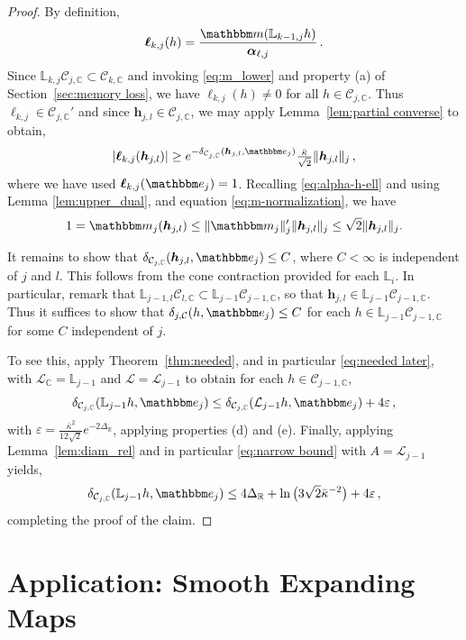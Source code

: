 \documentclass{amsart}
\numberwithin{equation}{section}
\newcommand\cC{{\mathcal C}}
\newcommand\cL{{\mathcal L}}
\newcommand\bC{{\mathbb C}}
\newcommand\bL{{\mathbb L}}
\newcommand\bR{{\mathbb R}}
\newcommand\ve{\varepsilon}
\newcommand{\bbe}{\mathbbm e}
\newcommand{\bbm}{\mathbbm m}
\begin{document}
 \begin{proof}
 By definition,
 \[
\boldsymbol{ \ell}_{k,j}(h) = \frac{\bbm(\bL_{k-1,j} h)}{\boldsymbol{\alpha}_{\ell,j} } \, .
 \]
Since $\bL_{k,j} \cC_{j,\bC} \subset \cC_{k, \bC}$ and invoking \eqref{eq:m_lower} and property (a) of Section~\ref{sec:memory loss}, we have
$\boldsymbol{\ell}_{k,j}(h) \ne 0$ for all $h \in \cC_{j,\bC}$.  Thus $\boldsymbol{\ell}_{k,j} \in \cC_{j,\bC}'$ and since 
$\boldsymbol{h}_{j,l} \in \cC_{j, \bC}$, we may
apply Lemma~\ref{lem:partial converse} to obtain,
\[
|\boldsymbol{\ell}_{k,j}(\boldsymbol{h}_{j,l})| \ge e^{-\delta_{\cC_{j, \bC}}(\boldsymbol{h}_{j,l}, \bbe_j)} \tfrac{\bar\kappa}{\sqrt{2}} \| \boldsymbol{h}_{j,l} \|_j \, ,
\]
where we have used $\boldsymbol{\ell}_{k,j}(\bbe_j) = 1$.  
Recalling \eqref{eq:alpha-h-ell} and using Lemma \ref{lem:upper_dual}, and equation \eqref{eq:m-normalization}, we have
\[
1=\bbm_j(\boldsymbol{h}_{j,l})\leq \|\bbm_j\|_j'\|\boldsymbol{h}_{j,l}\|_j\leq \sqrt 2\|\boldsymbol{h}_{j,l}\|_j.
\]

It remains to show that $\delta_{\cC_{j, \bC}}(\boldsymbol{h}_{j,l}, \bbe_j) \le C$, where $C<\infty$ is independent of $j$ and $l$.
This follows from the cone contraction provided for each $\bL_i$.  In particular, remark that
$\bL_{j-1, l} \cC_{l, \bC} \subset \bL_{j-1} \cC_{j-1, \bC}$, so that 
$\boldsymbol{h}_{j, l} \in \bL_{j-1} \cC_{j-1, \bC}$.  Thus it suffices to show that 
$\delta_{j, \cC}(h, \bbe_j) \le C$ for each $h \in \bL_{j-1}\cC_{j-1, \bC}$ for some $C$ independent of $j$. 

To see this, apply Theorem~\ref{thm:needed}, and in particular \eqref{eq:needed later}, with 
$\cL_{\bC} = \bL_{j-1}$ and $\cL = \cL_{j-1}$ to obtain for each $h \in \cC_{j-1, \bC}$,
\[
\delta_{\cC_{j, \bC}}(\bL_{j-1} h, \bbe_j) \le \delta_{\cC_{j, \bC}}(\cL_{j-1} h, \bbe_j) + 4 \ve \, ,
\]
with $\ve = \frac{\bar\kappa^2}{12\sqrt{2}} e^{-2\Delta_{\bR}}$, applying properties (d) and (e).
Finally, applying Lemma~\ref{lem:diam_rel} and in particular \eqref{eq:narrow bound} with $A = \cL_{j-1}$ yields,
\[
\delta_{\cC_{j, \bC}}(\bL_{j-1} h, \bbe_j) \le 4 \Delta_{\bR} + \ln \big(3 \sqrt{2} \bar\kappa^{-2} \big) + 4 \ve \, ,
\]
completing the proof of the claim.
\end{proof}



\section{Application: Smooth Expanding Maps}
\label{sec:expanding}
\end{document}

